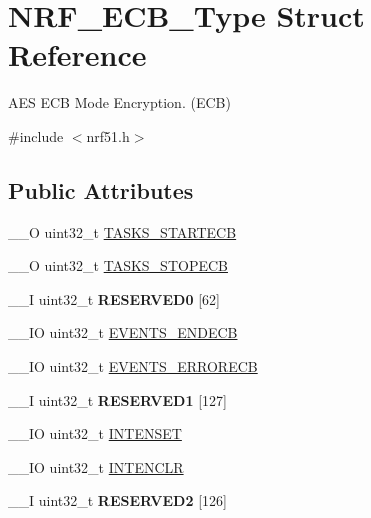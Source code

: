 \hypertarget{struct_n_r_f___e_c_b___type}{}\section{N\+R\+F\+\_\+\+E\+C\+B\+\_\+\+Type Struct Reference}
\label{struct_n_r_f___e_c_b___type}


A\+E\+S E\+C\+B Mode Encryption. (E\+C\+B)  




{\ttfamily \#include $<$nrf51.\+h$>$}

\subsection*{Public Attributes}
\begin{DoxyCompactItemize}
\item 
\+\_\+\+\_\+\+O uint32\+\_\+t \hyperlink{struct_n_r_f___e_c_b___type_ab9b2d57d5288323ecfa4a85ed8c88d2b}{T\+A\+S\+K\+S\+\_\+\+S\+T\+A\+R\+T\+E\+C\+B}
\item 
\+\_\+\+\_\+\+O uint32\+\_\+t \hyperlink{struct_n_r_f___e_c_b___type_aaccfa905d37e48c1edb5812d79386fb5}{T\+A\+S\+K\+S\+\_\+\+S\+T\+O\+P\+E\+C\+B}
\item 
\hypertarget{struct_n_r_f___e_c_b___type_ae00964d0fc9657e3b0eed2c7333abc5c}{}\+\_\+\+\_\+\+I uint32\+\_\+t {\bfseries R\+E\+S\+E\+R\+V\+E\+D0} \mbox{[}62\mbox{]}\label{struct_n_r_f___e_c_b___type_ae00964d0fc9657e3b0eed2c7333abc5c}

\item 
\+\_\+\+\_\+\+I\+O uint32\+\_\+t \hyperlink{struct_n_r_f___e_c_b___type_ac742b75da13533955fbc6d478ce7612b}{E\+V\+E\+N\+T\+S\+\_\+\+E\+N\+D\+E\+C\+B}
\item 
\+\_\+\+\_\+\+I\+O uint32\+\_\+t \hyperlink{struct_n_r_f___e_c_b___type_a08b5d7f910229e3a7945d7aa50c21936}{E\+V\+E\+N\+T\+S\+\_\+\+E\+R\+R\+O\+R\+E\+C\+B}
\item 
\hypertarget{struct_n_r_f___e_c_b___type_ace0c280901eaf06eb6083e8f818e623e}{}\+\_\+\+\_\+\+I uint32\+\_\+t {\bfseries R\+E\+S\+E\+R\+V\+E\+D1} \mbox{[}127\mbox{]}\label{struct_n_r_f___e_c_b___type_ace0c280901eaf06eb6083e8f818e623e}

\item 
\+\_\+\+\_\+\+I\+O uint32\+\_\+t \hyperlink{struct_n_r_f___e_c_b___type_a023f0bca4f324f71ff8a01ec4a6b9480}{I\+N\+T\+E\+N\+S\+E\+T}
\item 
\+\_\+\+\_\+\+I\+O uint32\+\_\+t \hyperlink{struct_n_r_f___e_c_b___type_a13324cdde7ab43078d7bd6ea5d1230f3}{I\+N\+T\+E\+N\+C\+L\+R}
\item 
\hypertarget{struct_n_r_f___e_c_b___type_adf99729ee0443a1de45af347b780e21a}{}\+\_\+\+\_\+\+I uint32\+\_\+t {\bfseries R\+E\+S\+E\+R\+V\+E\+D2} \mbox{[}126\mbox{]}\label{struct_n_r_f___e_c_b___type_adf99729ee0443a1de45af347b780e21a}


\end{DoxyCompactItemize}
